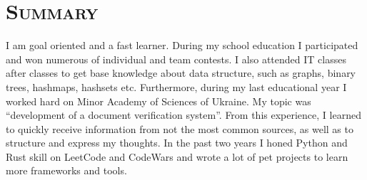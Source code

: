 \vspace*{-3em}
\section{\textsc{Summary}}

I am goal oriented and a fast learner.
During my school education I participated and won numerous of individual and team contests.
I also attended IT classes after classes to get base knowledge about data structure, such as graphs, binary trees, hashmaps, hashsets etc. 
Furthermore, during my last educational year I worked hard on Minor Academy of Sciences of Ukraine. 
My topic was “development of a document verification system”. 
From this experience, I learned to quickly receive information from not the most common sources, as well as to structure and express my thoughts. 
In the past two years I honed Python and Rust skill on LeetCode and CodeWars and wrote a lot of pet projects to learn more frameworks and tools.
